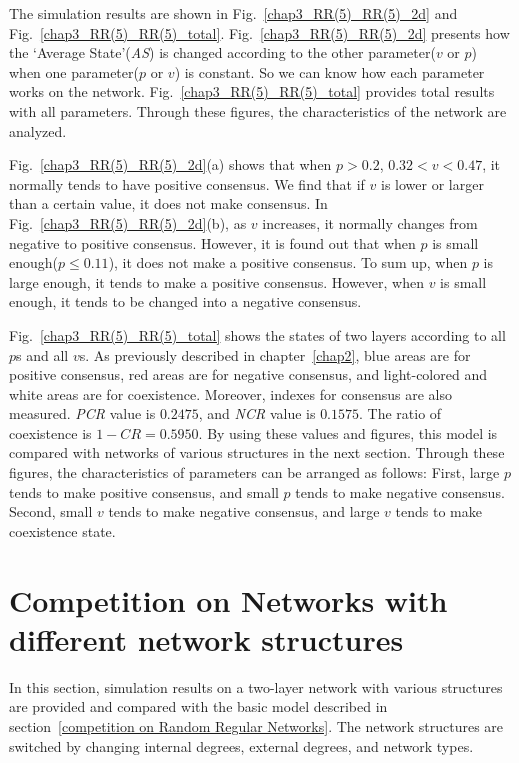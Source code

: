 The simulation results are shown in Fig.~\ref{chap3_RR(5)_RR(5)_2d} and Fig.~\ref{chap3_RR(5)_RR(5)_total}.  Fig.~\ref{chap3_RR(5)_RR(5)_2d} presents how the `Average State'(\textit{AS}) is changed according to the other parameter($v$ or $p$) when one parameter($p$ or $v$) is constant. So we can know how each parameter works on the network. Fig.~\ref{chap3_RR(5)_RR(5)_total} provides total results with all parameters. Through these figures, the characteristics of the network are analyzed.

Fig.~\ref{chap3_RR(5)_RR(5)_2d}(a) shows that when $p > 0.2$, $0.32 < v < 0.47$, it normally tends to have positive consensus. We find that if $v$ is lower or larger than a certain value, it does not make consensus. In Fig.~\ref{chap3_RR(5)_RR(5)_2d}(b), as $v$ increases, it normally changes from negative to positive consensus. However, it is found out that when $p$ is small enough($p \le 0.11$), it does not make a positive consensus.  To sum up, when $p$ is large enough, it tends to make a positive consensus. However, when $v$ is small enough, it tends to be changed into a negative consensus.

Fig.~\ref{chap3_RR(5)_RR(5)_total} shows the states of two layers according to all $p$s and all $v$s. As previously described in chapter~\ref{chap2}, blue areas are for positive consensus, red areas are for negative consensus, and light-colored and white areas are for coexistence. Moreover, indexes for consensus are also measured. \textit{PCR} value is $0.2475$, and \textit{NCR} value is $0.1575$. The ratio of coexistence is $1 - CR = 0.5950$. By using these values and figures, this model is compared with networks of various structures in the next section. Through these figures, the characteristics of parameters can be arranged as follows: First, large $p$ tends to make positive consensus, and small $p$ tends to make negative consensus. Second, small $v$ tends to make negative consensus, and large $v$ tends to make coexistence state. \\


\section{Competition on Networks with different network structures}
In this section, simulation results on a two-layer network with various structures are provided and compared with the basic model described in section~\ref{competition on Random Regular Networks}.
The network structures are switched by changing internal degrees, external degrees, and network types. \\

